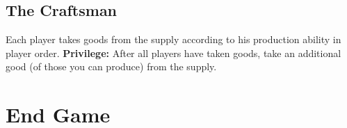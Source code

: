 \documentclass[12pt]{article}
\begin{document}
\begin{mdframed}[style = customFrame]
\begin{multicols*}{2}
\subsection*{The Craftsman}
Each player takes goods from the supply according to his production ability in player order. \textbf{Privilege:} After all players have taken goods, take an additional good (of those you can produce) from the supply.

\section*{End Game}

\end{multicols*}
\end{mdframed}
\end{document}
